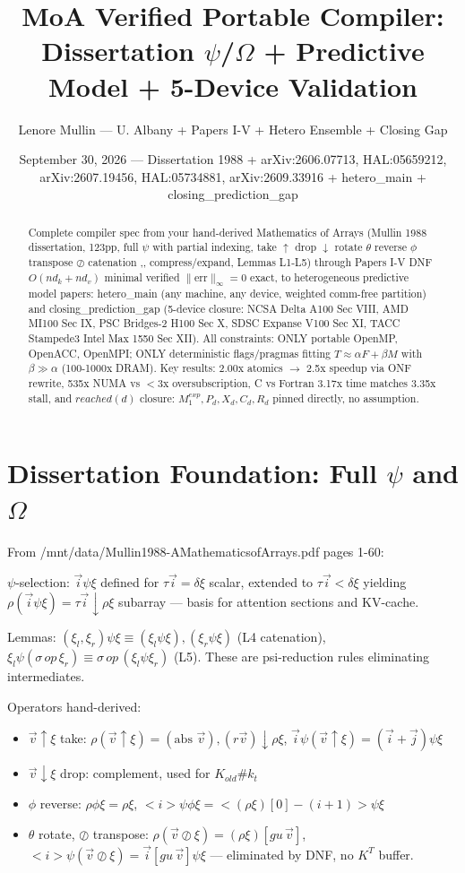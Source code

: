 \documentclass[11pt,a4paper]{article}
\title{MoA Verified Portable Compiler: Dissertation $\psi$/$\Omega$ + Predictive Model + 5-Device Validation}
\author{Lenore Mullin — U. Albany + Papers I-V + Hetero Ensemble + Closing Gap}
\date{September 30, 2026 — Dissertation 1988 + arXiv:2606.07713, HAL:05659212, arXiv:2607.19456, HAL:05734881, arXiv:2609.33916 + hetero\_main + closing\_prediction\_gap}
\begin{document}
\maketitle

\begin{abstract}
Complete compiler spec from your hand-derived Mathematics of Arrays (Mullin 1988 dissertation, 123pp, full $\psi$ with partial indexing, take $\uparrow$ drop $\downarrow$ rotate $\theta$ reverse $\phi$ transpose $\oslash$ catenation ,, compress/expand, Lemmas L1-L5) through Papers I-V DNF $O(nd_k+nd_v)$ minimal verified $\|\text{err}\|_\infty=0$ exact, to heterogeneous predictive model papers: hetero\_main (any machine, any device, weighted comm-free partition) and closing\_prediction\_gap (5-device closure: NCSA Delta A100 Sec VIII, AMD MI100 Sec IX, PSC Bridges-2 H100 Sec X, SDSC Expanse V100 Sec XI, TACC Stampede3 Intel Max 1550 Sec XII). All constraints: ONLY portable OpenMP, OpenACC, OpenMPI; ONLY deterministic flags/pragmas fitting $T\approx\alpha F+\beta M$ with $\beta\gg\alpha$ (100-1000x DRAM). Key results: 2.00x atomics $\rightarrow$ 2.5x speedup via ONF rewrite, 535x NUMA vs $<$3x oversubscription, C vs Fortran 3.17x time matches 3.35x stall, and $reached(d)$ closure: $M_1^{exp}, P_d, X_d, C_d, R_d$ pinned directly, no assumption.
\end{abstract}

\section{Dissertation Foundation: Full $\psi$ and $\Omega$}

From /mnt/data/Mullin1988-AMathematicsofArrays.pdf pages 1-60:

$\psi$-selection: $\vec i\psi\xi$ defined for $\tau\vec i=\delta\xi$ scalar, extended to $\tau\vec i<\delta\xi$ yielding $\rho(\vec i\psi\xi)=\tau\vec i\downarrow\rho\xi$ subarray — basis for attention sections and KV-cache.

Lemmas: $(\xi_l,\xi_r)\psi\xi\equiv(\xi_l\psi\xi),(\xi_r\psi\xi)$ (L4 catenation), $\xi_l\psi(\sigma\,op\,\xi_r)\equiv\sigma\,op\,(\xi_l\psi\xi_r)$ (L5). These are psi-reduction rules eliminating intermediates.

Operators hand-derived:
\begin{itemize}
\item $\vec v\uparrow\xi$ take: $\rho(\vec v\uparrow\xi)=(\text{abs }\vec v),(r\vec v)\downarrow\rho\xi$, $\vec i\psi(\vec v\uparrow\xi)=(\vec i+\vec j)\psi\xi$
\item $\vec v\downarrow\xi$ drop: complement, used for $K_{old}\#k_t$
\item $\phi$ reverse: $\rho\phi\xi=\rho\xi$, $<i>\psi\phi\xi=<(\rho\xi)[0]-(i+1)>\psi\xi$
\item $\theta$ rotate, $\oslash$ transpose: $\rho(\vec v\oslash\xi)=(\rho\xi)[gu\,\vec v]$, $<i>\psi(\vec v\oslash\xi)=\vec i[gu\,\vec v]\psi\xi$ — eliminated by DNF, no $K^T$ buffer.
\end{itemize}
\end{document}
